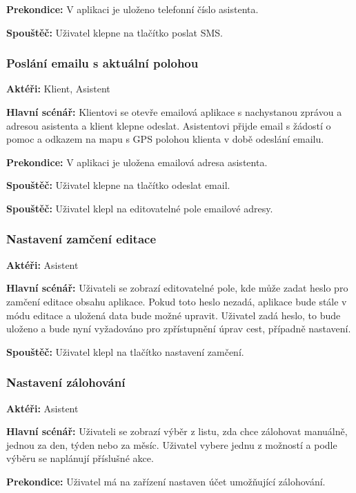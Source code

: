 \documentclass[czech,master,public,dept460,male,java,cpdeclaration]{diploma}
\newcommand{\usecase}[2]{\subsubsection{#1}\label{#2}}
\begin{document}
\vspace{0.1cm}
\noindent
\textbf{Prekondice:} V aplikaci je uloženo telefonní číslo asistenta.

\vspace{0.1cm}
\noindent
\textbf{Spouštěč:} Uživatel klepne na tlačítko poslat SMS.


\usecase{Poslání emailu s aktuální polohou}{pomocemail}
\textbf{Aktéři:} Klient, Asistent

\vspace{0.1cm}
\noindent
\textbf{Hlavní scénář:} Klientovi se otevře emailová aplikace s nachystanou zprávou a adresou asistenta
a klient klepne odeslat. Asistentovi přijde email s žádostí o pomoc a odkazem na mapu s GPS polohou
klienta v době odeslání emailu.

\vspace{0.1cm}
\noindent
\textbf{Prekondice:} V aplikaci je uložena emailová adresa asistenta.

\vspace{0.1cm}
\noindent
\textbf{Spouštěč:} Uživatel klepne na tlačítko odeslat email.

\vspace{0.1cm}
\noindent
\textbf{Spouštěč:} Uživatel klepl na editovatelné pole emailové adresy.


\usecase{Nastavení zamčení editace}{nastavenizamceni}
\textbf{Aktéři:} Asistent

\vspace{0.1cm}
\noindent
\textbf{Hlavní scénář:} Uživateli se zobrazí editovatelné pole, kde může zadat heslo pro zamčení editace
obsahu aplikace. Pokud toto heslo nezadá, aplikace bude stále v módu editace a uložená data bude možné upravit.
Uživatel zadá heslo, to bude uloženo a bude nyní vyžadováno pro zpřístupnění úprav cest, případně nastavení.

\vspace{0.1cm}
\noindent
\textbf{Spouštěč:} Uživatel klepl na tlačítko nastavení zamčení.

\usecase{Nastavení zálohování}{nastavenizalohovani}
\textbf{Aktéři:} Asistent

\vspace{0.1cm}
\noindent
\textbf{Hlavní scénář:} Uživateli se zobrazí výběr z listu, zda chce zálohovat manuálně, jednou za den, týden
nebo za měsíc. Uživatel vybere jednu z možností a podle výběru se naplánují příslušné akce.

\vspace{0.1cm}
\noindent
\textbf{Prekondice:} Uživatel má na zařízení nastaven účet umožňující zálohování.
\end{document}
